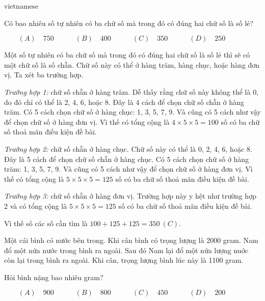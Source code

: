 \documentclass{article}
\begin{document}
\begin{otherlanguage*}{vietnamese}
\begin{problem*}[PI-2024-C-P2]
    Có bao nhiêu số tự nhiên có ba chữ số mà trong đó có đúng hai chữ số là số lẻ?

    \[
        (A) \quad 750 \qquad \quad
        (B) \quad 400 \qquad \quad
        (C) \quad 350 \qquad \quad
        (D) \quad 250 \qquad \quad
    \]
\end{problem*}

\begin{soln}
    Một số tự nhiên có ba chữ số mà trong đó có đúng hai chữ số là số lẻ thì sẽ có một chữ số là số chẵn.
    Chữ số này có thể ở hàng trăm, hàng chục, hoặc hàng đơn vị. Ta xét ba trường hợp.

    \textit{Trường hợp 1:} chữ số chẵn ở hàng trăm. Dễ thấy rằng chữ số này không thể là 0, do đó chỉ có thể là 2, 4, 6, hoặc 8.
    Đây là 4 cách để chọn chữ số chẵn ở hàng trăm. Có 5 cách chọn chữ số ở hàng chục: 1, 3, 5, 7, 9. Và cũng có 5 cách như vậy để chọn chữ số ở hàng đơn vị.
    Vì thế có tổng cộng là $4 \times 5\times 5= 100$ số có ba chữ số thoả mãn điều kiện đề bài.

    \textit{Trường hợp 2:} chữ số chẵn ở hàng chục. Chữ số này có thể là 0, 2, 4, 6, hoặc 8.
    Đây là 5 cách để chọn chữ số chẵn ở hàng chục. Có 5 cách chọn chữ số ở hàng trăm: 1, 3, 5, 7, 9. Và cũng có 5 cách như vậy để chọn chữ số ở hàng đơn vị.
    Vì thế có tổng cộng là $5 \times 5\times 5= 125$ số có ba chữ số thoả mãn điều kiện đề bài.

    \textit{Trường hợp 3:} chữ số chẵn ở hàng đơn vị. Trường hợp này y hệt như trường hợp 2 và có tổng cộng là $5 \times 5\times 5= 125$ số có ba chữ số thoả mãn điều kiện đề bài.

    Vì thế số các số cần tìm là $100 + 125 + 125 = \boxed{350\ (C).}$
\end{soln}

\bigbreak

\begin{problem*}[PI-2024-C-P3]
    \label{problem:pi-2024-c-p3}

    Một cái bình có nước bên trong. Khi cân bình có trọng lượng là 2000 gram.
    Nam đổ một nửa nước trong bình ra ngoài.
    Sau đó Nam lại đổ một nửa lượng nuớc còn lại trong bình ra ngoài.
    Khi cân, trọng lượng bình lúc này là 1100 gram.

    Hỏi bình nặng bao nhiêu gram?

    \[
        (A) \quad 900 \qquad \quad
        (B) \quad 800 \qquad \quad
        (C) \quad 450 \qquad \quad
        (D) \quad 200 \qquad \quad
    \]
\end{problem*}


\end{otherlanguage*}
\end{document}
